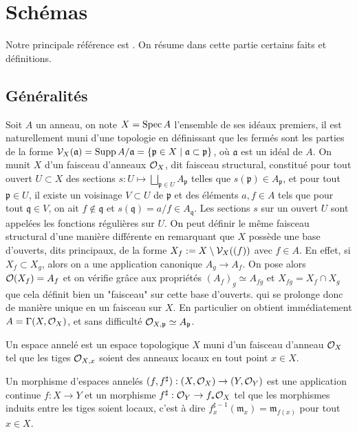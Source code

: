 \section{Schémas}

Notre principale référence est \cite{Hartshorne}. On résume dans cette partie certains faits et définitions. 

\subsection{Généralités}

Soit $A$ un anneau, on note $X=\operatorname{Spec} A$ l'ensemble de ses idéaux premiers, il est naturellement muni d'une topologie en définissant que les fermés sont les parties de la forme $\mathcal{V}_X(\mathfrak{a})=\operatorname{Supp} A/\mathfrak{a}=\lbrace \mathfrak{p}\in X\mid \mathfrak{a}\subset \mathfrak{p}\rbrace$, où $\mathfrak{a}$ est un idéal de $A$. On munit $X$ d'un faisceau d'anneaux $\mathcal{O}_X$, dit faisceau structural, constitué pour tout ouvert $U\subset X$ des sections $s: U\mapsto \bigsqcup_{\mathfrak{p}\in U}A_\mathfrak{p}$ telles que $s(\mathfrak{p})\in A_\mathfrak{p}$, et pour tout $\mathfrak{p}\in U$, il existe un voisinage $V\subset U$ de $\mathfrak{p}$ et des éléments $a,f\in A$ tels que pour tout $\mathfrak{q}\in V$, on ait $f\notin \mathfrak{q}$ et $s(\mathfrak{q})=a/f\in A_\mathfrak{q}$. Les sections $s$ sur un ouvert $U$ sont appelées les fonctions régulières sur $U$. On peut définir le même faisceau structural d'une manière différente en remarquant que $X$ possède une base d'ouverts, dits principaux, de la forme $X_f:=X\setminus \mathcal{V}_X((f))$ avec $f\in A$. En effet, si $X_f\subset X_g$, alors on a une application canonique $A_g\rightarrow A_f$. On pose alors $\mathcal{O}(X_f)=A_f$ et on vérifie grâce aux propriétés $(A_f)_g\simeq A_{fg}$ et $X_{fg}=X_f\cap X_g$ que cela définit bien un "faisceau" sur cette base d'ouverts. qui se prolonge donc de manière unique en un faisceau sur $X$. En particulier on obtient immédiatement $A=\Gamma(X, \mathcal{O}_X)$, et sans difficulté $\mathcal{O}_{X,\mathfrak{p}}\simeq A_\mathfrak{p}$. 

\begin{defn}
Un espace annelé est un espace topologique $X$ muni d'un faisceau d'anneau $\mathcal{O}_X$ tel que les tiges $\mathcal{O}_{X,x}$ soient des anneaux locaux en tout point $x\in X$.

Un morphisme d'espaces annelés $(f, f^\sharp):(X,\mathcal{O}_X)\rightarrow (Y,\mathcal{O}_Y)$ est une application continue $f:X\rightarrow Y$ et un morphisme $f^\sharp:\mathcal{O}_Y\rightarrow f_*\mathcal{O}_X$ tel que les morphismes induits entre les tiges soient locaux, c'est à dire $f^{\sharp -1}_x(\mathfrak{m}_x)=\mathfrak{m}_{f(x)}$ pour tout $x\in X$.
\end{defn}

